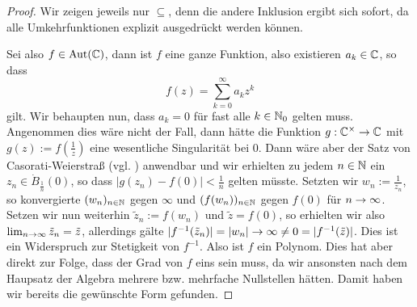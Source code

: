 \begin{proof}
  Wir zeigen jeweils nur $\subseteq$, denn die andere Inklusion ergibt
  sich sofort, da alle Umkehrfunktionen explizit ausgedrückt werden
  können.

  Sei also $f \in \operatorname{Aut}(\mathbb{C})$, dann ist $f$ eine ganze Funktion, also
  existieren $a_k \in \mathbb{C}$, so dass
  \[
  f(z) = \sum_{k=0}^\infty a_k z^k
  \]
  gilt. Wir behaupten nun, dass $a_k = 0$ für fast alle $k \in \mathbb{N}_0$
  gelten muss. Angenommen dies wäre nicht der Fall, dann hätte die
  Funktion $g: \mathbb{C}^\times \rightarrow \mathbb{C}$ mit $g(z) := f(\frac{1}{z})$ eine
  wesentliche Singularität bei $0$. Dann wäre aber der Satz von
  Casorati-Weierstraß (vgl. \cite[Satz 6.11]{Kas}) anwendbar und wir
  erhielten zu jedem $n \in \mathbb{N}$
  ein $z_n \in \dot B_{\frac{1}{n}}(0)$, so dass $|g(z_n) - f(0)| <
  \frac{1}{n}$ gelten müsste. Setzten wir $w_n := \frac{1}{z_n}$, so konvergierte
  $(w_n)_{n \in \mathbb{N}}$ gegen $\infty$ und $(f(w_n))_{n \in \mathbb{N}}$ gegen $f(0)$ für $n \rightarrow
  \infty$. Setzen wir nun weiterhin $\tilde z_n := f(w_n)$ und $\tilde
  z = f(0)$, so erhielten wir also $\lim_{n \rightarrow \infty} \tilde z_n =
  \tilde z$, allerdings gälte $|f^{-1}(\tilde z_n)| = |w_n| \rightarrow \infty
  \neq 0 = |f^{-1}(\tilde z)|$. Dies ist ein Widerspruch zur
  Stetigkeit von $f^{-1}$. Also ist $f$ ein Polynom. Dies hat aber
  direkt zur Folge, dass der Grad von $f$ eins sein muss, da wir
  ansonsten nach dem Haupsatz der Algebra mehrere bzw. mehrfache Nullstellen
  hätten. Damit haben wir bereits die gewünschte Form gefunden.


\end{proof}
